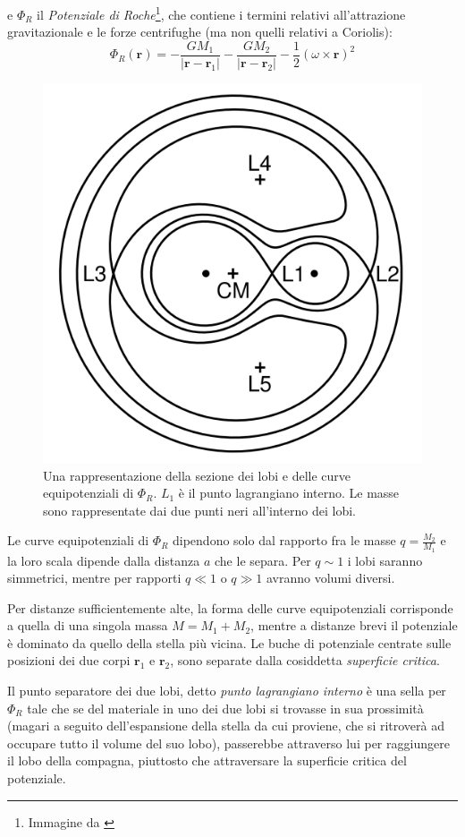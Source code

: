 \documentclass[a4paperbi]{article}
\begin{document}
	e $\Phi_R$ il \textit{Potenziale di Roche}\footnote{Immagine da \cite{FrankKingRaineAccretionPower}}, che contiene i termini relativi all'attrazione gravitazionale e le forze centrifughe (ma non quelli relativi a Coriolis):
	\begin{equation}
		\Phi_R(\textbf{r})=-\frac{GM_1}{\vert\textbf{r}-\textbf{r}_1\vert}-\frac{GM_2}{\vert\textbf{r}-\textbf{r}_2\vert}-\frac{1}{2}(\omega\times\textbf{r})^2
	\end{equation}
	
	\begin{figure}[H]
		\centering
		\includegraphics[width=0.6\linewidth]{RocheEquipotential}
		\caption{Una rappresentazione della sezione dei lobi e delle curve equipotenziali di $\Phi_R$. $L_1$ è il punto lagrangiano interno. Le masse sono rappresentate dai due punti neri all'interno dei lobi.}
		\label{fig:rocheequipotential}
	\end{figure}
	
	Le curve equipotenziali di $\Phi_R$ dipendono solo dal rapporto fra le masse $q=\frac{M_2}{M_1}$ e la loro scala dipende dalla distanza $a$ che le separa. Per $q\sim1$ i lobi saranno simmetrici, mentre per rapporti $q\ll1$ o $q\gg1$ avranno volumi diversi.
	
	Per distanze sufficientemente alte, la forma delle curve equipotenziali corrisponde a quella di una singola massa $M=M_1+M_2$, mentre a distanze brevi il potenziale è dominato da quello della stella più vicina. Le buche di potenziale centrate sulle posizioni dei due corpi $\textbf{r}_1$ e $\textbf{r}_2$, sono separate dalla cosiddetta \textit{superficie critica}.
	
	Il punto separatore dei due lobi, detto \textit{punto lagrangiano interno} è una sella per $\Phi_R$ tale che se del materiale in uno dei due lobi si trovasse in sua prossimità (magari a seguito dell'espansione della stella da cui proviene, che si ritroverà ad occupare tutto il volume del suo lobo), passerebbe attraverso lui per raggiungere il lobo della compagna, piuttosto che attraversare la superficie critica del potenziale.
	
\end{document}

